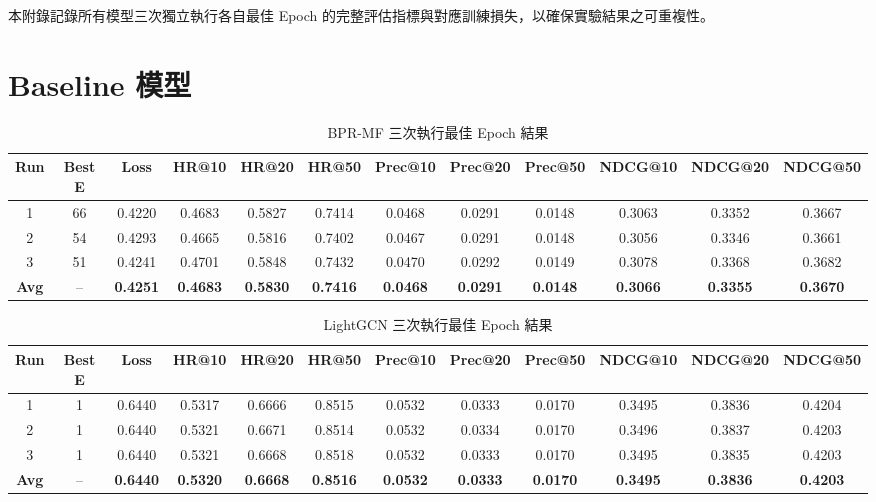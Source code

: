
\label{app:training_log}

本附錄記錄所有模型三次獨立執行各自最佳 Epoch 的完整評估指標與對應訓練損失，以確保實驗結果之可重複性。

\section{Baseline 模型}

\begin{table}[H]
  \centering
  \footnotesize
  \setlength{\tabcolsep}{3pt}
  \caption{BPR-MF 三次執行最佳 Epoch 結果}
  \label{tab:bprmf_runs}
  \begin{tabular}{c c c ccc ccc ccc}
    \toprule
    Run & Best E & Loss & HR@10 & HR@20 & HR@50 & Prec@10 & Prec@20 & Prec@50 & NDCG@10 & NDCG@20 & NDCG@50 \\
    \midrule
    1 & 66 & 0.4220 & 0.4683 & 0.5827 & 0.7414 & 0.0468 & 0.0291 & 0.0148 & 0.3063 & 0.3352 & 0.3667 \\
    2 & 54 & 0.4293 & 0.4665 & 0.5816 & 0.7402 & 0.0467 & 0.0291 & 0.0148 & 0.3056 & 0.3346 & 0.3661 \\
    3 & 51 & 0.4241 & 0.4701 & 0.5848 & 0.7432 & 0.0470 & 0.0292 & 0.0149 & 0.3078 & 0.3368 & 0.3682 \\
    \midrule
    \textbf{Avg} & -- & \textbf{0.4251} & \textbf{0.4683} & \textbf{0.5830} & \textbf{0.7416} & \textbf{0.0468} & \textbf{0.0291} & \textbf{0.0148} & \textbf{0.3066} & \textbf{0.3355} & \textbf{0.3670} \\
    \bottomrule
  \end{tabular}
\end{table}

\begin{table}[H]
  \centering
  \footnotesize
  \setlength{\tabcolsep}{3pt}
  \caption{LightGCN 三次執行最佳 Epoch 結果}
  \label{tab:lightgcn_runs}
  \begin{tabular}{c c c ccc ccc ccc}
    \toprule
    Run & Best E & Loss & HR@10 & HR@20 & HR@50 & Prec@10 & Prec@20 & Prec@50 & NDCG@10 & NDCG@20 & NDCG@50 \\
    \midrule
    1 & 1 & 0.6440 & 0.5317 & 0.6666 & 0.8515 & 0.0532 & 0.0333 & 0.0170 & 0.3495 & 0.3836 & 0.4204 \\
    2 & 1 & 0.6440 & 0.5321 & 0.6671 & 0.8514 & 0.0532 & 0.0334 & 0.0170 & 0.3496 & 0.3837 & 0.4203 \\
    3 & 1 & 0.6440 & 0.5321 & 0.6668 & 0.8518 & 0.0532 & 0.0333 & 0.0170 & 0.3495 & 0.3835 & 0.4203 \\
    \midrule
    \textbf{Avg} & -- & \textbf{0.6440} & \textbf{0.5320} & \textbf{0.6668} & \textbf{0.8516} & \textbf{0.0532} & \textbf{0.0333} & \textbf{0.0170} & \textbf{0.3495} & \textbf{0.3836} & \textbf{0.4203} \\
    \bottomrule
  \end{tabular}
\end{table}

